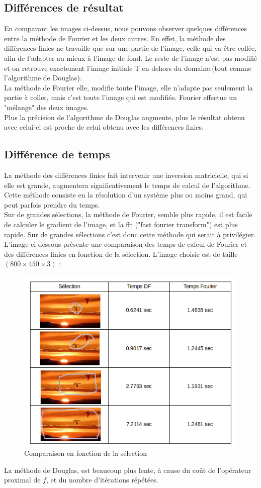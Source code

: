 
\subsection{Différences de résultat}
En comparant les images ci-dessus, nous pouvons observer quelques différences entre la méthode de Fourier et les deux autres. En effet, la méthode des différences finies ne travaille que sur une partie de l'image, celle qui va être collée, afin de l'adapter au mieux à l'image de fond. Le reste de l'image n'est pas modifié et on retrouve exactement l'image initiale T en dehors du domaine.(tout comme l'algorithme de Douglas). \\
La méthode de Fourier elle, modifie toute l'image, elle n'adapte pas seulement la partie à coller, mais c'est toute l'image qui est modifiée. Fourier effectue un "mélange" des deux images. \\
Plus la précision de l'algorithme de Douglas augmente, plus le résultat obtenu avec celui-ci est proche de celui obtenu avec les différences finies.
\subsection{Différence de temps}
La méthode des différences finies fait intervenir une inversion matricielle, qui si elle est grande, augmentera significativement le temps de calcul de l'algorithme. Cette méthode consiste en la résolution d'un système plus ou moins grand, qui peut parfois prendre du temps. \\
Sur de grandes sélections, la méthode de Fourier, semble plus rapide, il est facile de calculer le gradient de l'image, et la fft ("fast fourier transform") est plus rapide. Sur de grandes sélections c'est donc cette méthode qui serait à privilégier.\\
L'image ci-dessous présente une comparaison des temps de calcul de Fourier et des différences finies en fonction de la sélection. L'image choisie est de taille $(800 \times 450 \times 3)$ :
\begin{figure}[H]
\centering
\includegraphics[scale=0.4]{Images/comparaisonFD.png}
\caption{Comparaison en fonction de la sélection}
\end{figure}
La méthode de Douglas, est beaucoup plus lente, à cause du coût de l'opérateur proximal de $f$, et du nombre d'itérations répétées.  
